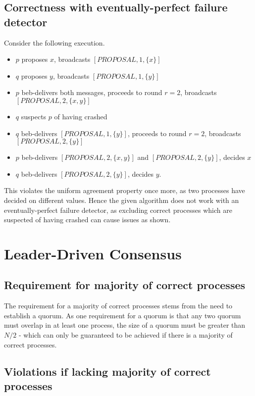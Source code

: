 \documentclass[a4paper]{scrreprt}
\begin{document}
\subsection{Correctness with eventually-perfect failure detector}

Consider the following execution.

\begin{itemize}
	\item $p$ proposes $x$, broadcasts $[PROPOSAL, 1, \{x\}]$
	\item $q$ proposes $y$, broadcasts $[PROPOSAL, 1, \{y\}]$
	\item $p$ beb-delivers both messages, proceeds to round $r = 2$, broadcasts $[PROPOSAL, 2, \{x, y\}]$
	\item $q$ suspects $p$ of having crashed
	\item $q$ beb-delivers $[PROPOSAL, 1, \{y\}]$, proceeds to round $r = 2$, broadcasts $[PROPOSAL, 2, \{y\}]$
	\item $p$ beb-delivers $[PROPOSAL, 2, \{x, y\}]$ and $[PROPOSAL, 2, \{y\}]$, decides $x$
	\item $q$ beb-delivers $[PROPOSAL, 2, \{y\}]$, decides $y$.
\end{itemize}

This violates the uniform agreement property once more, as two processes have
decided on different values. Hence the given algorithm does not work with an
eventually-perfect failure detector, as excluding correct processes which are
suspected of having crashed can cause issues as shown.

\section{Leader-Driven Consensus}

\subsection{Requirement for majority of correct processes}

The requirement for a majority of correct processes stems from the need to
establish a quorum. As one requirement for a quorum is that any two quorum must
overlap in at least one process, the size of a quorum must be greater than $N /
2$ - which can only be guaranteed to be achieved if there is a majority of
correct processes.

\subsection{Violations if lacking majority of correct processes}
\end{document}
